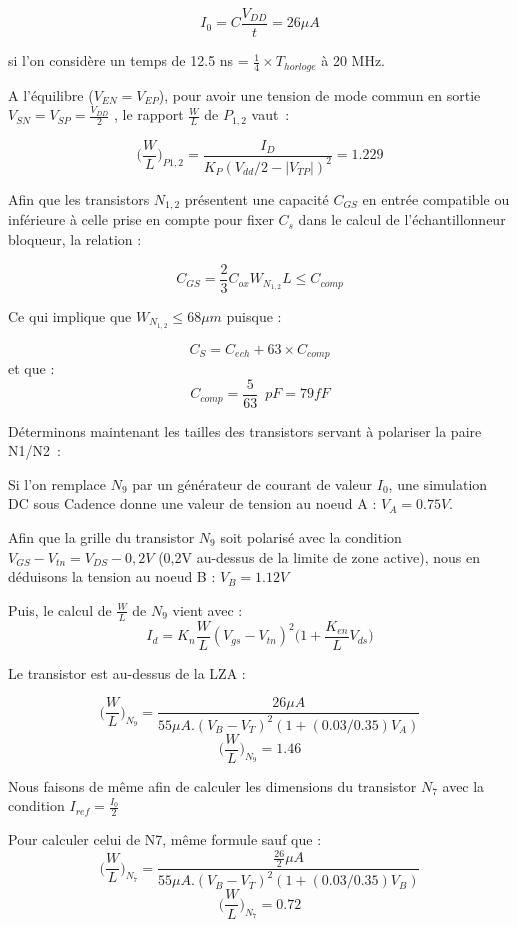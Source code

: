 \documentclass[11pt]{article}
\begin{document}
\[
I_0 = C \frac{V_{DD}}{t} = 26 \mu A
\]

si l'on consid\`ere un temps de 12.5 ns = $\frac{1}{4} \times T_{horloge}$ \`a 20 MHz.

A l'\'equilibre ($V_{EN} = V_{EP}$), pour avoir une tension de mode commun en sortie
$V_{SN} = V_{SP} = \frac{V_{DD}}{2}$ , le rapport $\frac{W}{L}$ de $P_{1,2}$ vaut :

\[
  \bigg(\frac{W}{L}\bigg)_{P1,2} = \frac{I_D}{K_P (V_{dd}/2 - |V_{TP}|)^{2}} = 1.229
\]

Afin que les transistors $N_{1,2}$ pr\'esentent une capacit\'e $C_{GS}$ en entr\'ee compatible
ou inf\'erieure \`a celle prise en compte pour fixer $C_s$ dans le calcul de l'\'echantillonneur
bloqueur, la relation :

\[
  C_{GS} = \frac{2}{3} C_{ox} W_{N_{1,2}} L \leq C_{comp}
\]

Ce qui implique que $W_{N_{1,2}} \leq 68 \mu m$ puisque :

\[
  C_S = C_{ech} + 63 \times C_{comp}
\]
et que :
\[
  C_{comp} = \frac{5}{63} \phantom{2} pF = 79 fF
\]

D\'eterminons maintenant les tailles des transistors servant \`a polariser la paire N1/N2 :

Si l'on remplace $N_{9}$ par un g\'en\'erateur de courant de valeur $I_{0}$, une simulation DC
sous Cadence donne une valeur de tension au noeud A : $V_A = 0.75 V$.

Afin que la grille du transistor $N_9$ soit polaris\'e avec la condition $V_{GS}-V_{tn}=V_{DS} - 0,2V$
 (0,2V au-dessus de la limite de zone active), nous en d\'eduisons la tension au noeud B : $V_B = 1.12 V$

Puis, le calcul de $\frac{W}{L}$ de $N_9$ vient avec :
\[
  I_d = K_n \frac{W}{L} (V_{gs} - V_{tn})^2 \bigg( 1 + \frac{K_{en}}{L} V_{ds}\bigg)
\]

Le transistor est au-dessus de la LZA :

\[
\bigg(\frac{W}{L} \bigg)_{N_9} = \frac {26\mu A}{55\mu A . (V_B - V_T)^2 ( 1+ (0.03/0.35) V_A)}
\]
\[
\bigg(\frac{W}{L} \bigg)_{N_9} = 1.46
\]

Nous faisons de m\^eme afin de calculer les dimensions du transistor $N_7$ avec la condition
$I_{ref} =\frac{I_0}{2}$

Pour calculer celui de N7, m\^eme formule sauf que :
\[
  \bigg(\frac{W}{L} \bigg)_{N_7} = \frac {\frac{26}{2}\mu A  }{55 \mu A . (V_B - V_T)^2 ( 1+ (0.03/0.35) V_B)}
\]
\[
\bigg(\frac{W}{L} \bigg)_{N_7} = 0.72
\]
\end{document}
